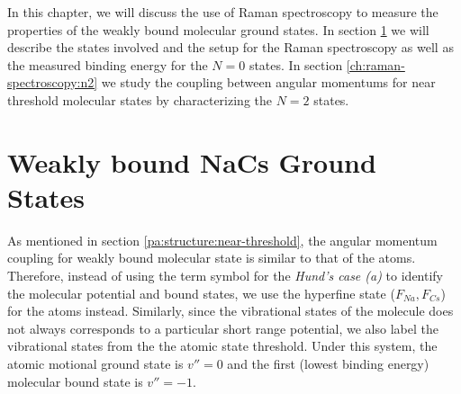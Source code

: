 In this chapter, we will discuss the use of Raman spectroscopy
to measure the properties of the weakly bound molecular ground states.
In section \ref{ch:raman-spectroscopy:states}
we will describe the states involved and the setup for the Raman spectroscopy
as well as the measured binding energy for the $N=0$ states.
In section \ref{ch:raman-spectroscopy:n2}
we study the coupling between angular momentums for near threshold molecular states
by characterizing the $N=2$ states.

\section{Weakly bound NaCs Ground States}
\label{ch:raman-spectroscopy:states}

As mentioned in section \ref{pa:structure:near-threshold},
the angular momentum coupling for weakly bound molecular state is similar to that of the atoms.
Therefore, instead of using the term symbol for the \textit{Hund's case (a)}
to identify the molecular potential and bound states,
we use the hyperfine state ($F_{Na}, F_{Cs}$) for the atoms instead.
Similarly, since the vibrational states of the molecule does not always corresponds to
a particular short range potential, we also label the vibrational states
from the the atomic state threshold.
Under this system, the atomic motional ground state is $v''=0$ and
the first (lowest binding energy) molecular bound state is $v''=-1$.

